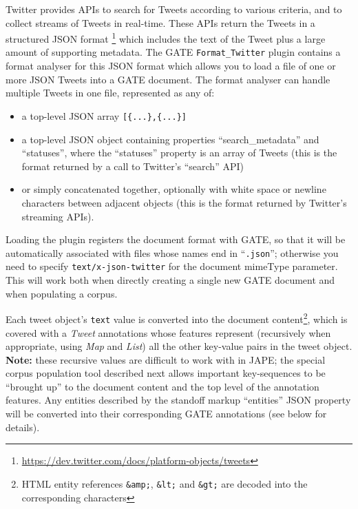 %
Twitter provides APIs to search for Tweets according to various criteria, and
to collect streams of Tweets in real-time.  These APIs return the Tweets in a
structured JSON format%
\footnote{\url{https://dev.twitter.com/docs/platform-objects/tweets}} which
includes the text of the Tweet plus a large amount of supporting metadata.
The GATE \verb!Format_Twitter! plugin contains a format analyser for this JSON format
which allows you to load a file of one or more JSON Tweets into a GATE
document.  The format analyser can handle multiple Tweets in one file,
represented as any of:
\begin{itemize}
\item a top-level JSON array \verb![{...},{...}]!
\item a top-level JSON object containing properties ``search\_metadata'' and
  ``statuses'', where the ``statuses'' property is an array of Tweets (this is
  the format returned by a call to Twitter's ``search'' API)
\item or simply concatenated together, optionally with white space or newline
  characters between adjacent objects (this is the format returned by Twitter's
  streaming APIs).
\end{itemize}
Loading the plugin registers the
document format with GATE, so that it will be automatically associated with
files whose names end in ``\verb!.json!''; otherwise you need to specify
\verb!text/x-json-twitter! for the document mimeType parameter.  This will work
both when directly creating a single new GATE document and when populating a
corpus.

Each tweet object's \verb!text! value is converted into the document
content\footnote{HTML entity references \texttt{\&amp;}, \texttt{\&lt;} and
\texttt{\&gt;} are decoded into the corresponding characters},
which is covered with a \emph{Tweet} annotations whose features represent
(recursively when appropriate, using \emph{Map} and \emph{List}) all the other
key-value pairs in the tweet object.  \textbf{Note:} these recursive values are
difficult to work with in JAPE; the special corpus population tool described
next allows important key-sequences to be ``brought up'' to the document content
and the top level of the annotation features.  Any entities described by the
standoff markup ``entities'' JSON property will be converted into their
corresponding GATE annotations (see below for details).

